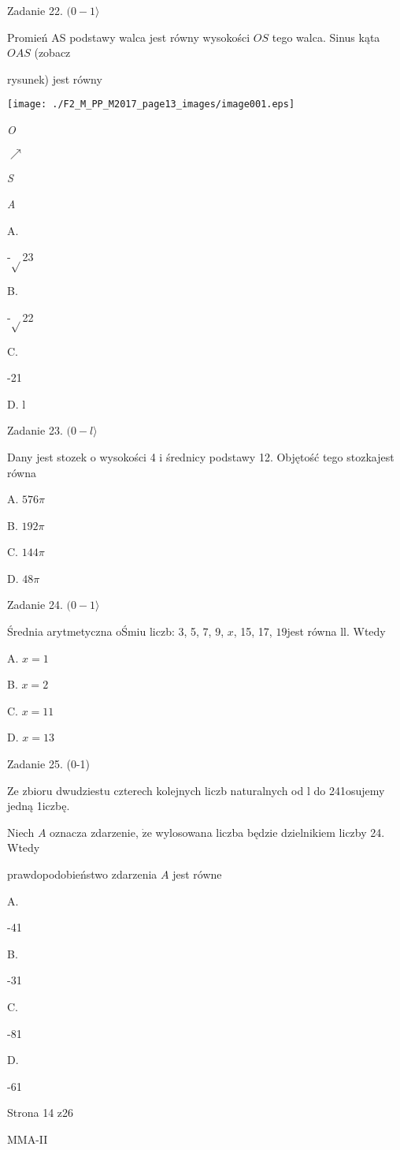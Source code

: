 \documentclass[a4paper,12pt]{article}
\begin{document}
Zadanie 22. $(0-1\rangle$

Promień AS podstawy walca jest równy wysokości $OS$ tego walca. Sinus kąta $OAS$ (zobacz

rysunek) jest równy
\begin{center}
\texttt{[image: ./F2\_M\_PP\_M2017\_page13\_images/image001.eps]}
\end{center}
{\it O}

$\nearrow$

{\it S}

{\it A}

A.

-$\sqrt{}$23

B.

-$\sqrt{}$22

C.

-21

D. l

Zadanie 23. $(0-l\rangle$

Dany jest stozek o wysokości 4 i średnicy podstawy 12. Objętość tego stozkajest równa

A. $ 576\pi$

B. $ 192\pi$

C. $ 144\pi$

D. $ 48\pi$

Zadanie 24. $(0-1\rangle$

Średnia arytmetyczna oŚmiu liczb: 3, 5, 7, 9, $x$, 15, 17, $19$jest równa ll. Wtedy

A. $x=1$

B. $x=2$

C. $x=11$

D. $x=13$

Zadanie 25. (0-1)

Ze zbioru dwudziestu czterech kolejnych liczb naturalnych od l do 241osujemy jedną 1iczbę.

Niech $A$ oznacza zdarzenie, $\dot{\mathrm{z}}\mathrm{e}$ wylosowana liczba będzie dzielnikiem liczby 24. Wtedy

prawdopodobieństwo zdarzenia $A$ jest równe

A.

-41

B.

-31

C.

-81

D.

-61

Strona 14 z26

MMA-II
\end{document}
